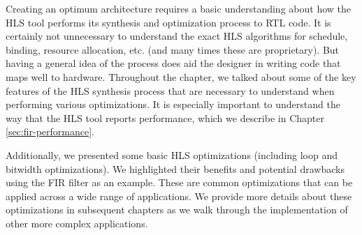 Creating an optimum architecture requires a basic understanding about how the HLS tool performs its synthesis and optimization process to RTL code. It is certainly not unnecessary to understand the exact HLS algorithms for schedule, binding, resource allocation, etc. (and many times these are proprietary). But having a general idea of the process does aid the designer in writing code that maps well to hardware. Throughout the chapter, we talked about some of the key features of the HLS synthesis process that are necessary to understand when performing various optimizations. It is especially important to understand the way that the HLS tool reports performance, which we describe in Chapter \ref{sec:fir-performance}. 

Additionally, we presented some basic HLS optimizations (including loop and bitwidth optimizations). We highlighted their benefits and potential drawbacks using the FIR filter as an example. These are common optimizations that can be applied across a wide range of applications. We provide more details about these optimizations in subsequent chapters as we walk through the implementation of other more complex applications. 


